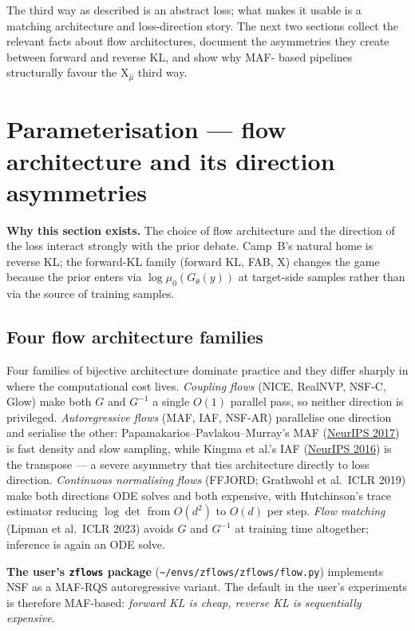 \documentclass[11pt,letterpaper]{article}
\newcommand{\Xfun}{\mathrm{X}}
\theoremstyle{plain}
\begin{document}
The third way as described is an abstract loss; what makes it usable is a
matching architecture and loss-direction story. The next two sections
collect the relevant facts about flow architectures, document the
asymmetries they create between forward and reverse KL, and show why MAF-
based pipelines structurally favour the $\Xfun_{\hat\mu}$ third way.

\section{Parameterisation --- flow architecture and its direction asymmetries}

\begin{callout}
\textbf{Why this section exists.} The choice of flow architecture and the direction
of the loss interact strongly with the prior debate. Camp~B's natural home is
reverse KL; the forward-KL family (forward KL, FAB, $\Xfun$) changes the game
because the prior enters via $\log\mu_0(G_\theta(y))$ at target-side samples
rather than via the source of training samples.
\end{callout}

\subsection{Four flow architecture families}

Four families of bijective architecture dominate practice and they differ
sharply in where the computational cost lives. \emph{Coupling flows} (NICE,
RealNVP, NSF-C, Glow) make both $G$ and $G^{-1}$ a single $O(1)$ parallel
pass, so neither direction is privileged. \emph{Autoregressive flows} (MAF,
IAF, NSF-AR) parallelise one direction and serialise the other:
Papamakarios--Pavlakou--Murray's MAF
(\href{https://arxiv.org/abs/1705.07057}{NeurIPS 2017}) is fast density and
slow sampling, while Kingma et al.'s IAF
(\href{https://arxiv.org/abs/1606.04934}{NeurIPS 2016}) is the transpose ---
a severe asymmetry that ties architecture directly to loss direction.
\emph{Continuous normalising flows} (FFJORD; Grathwohl et al.\ ICLR 2019) make
both directions ODE solves and both expensive, with Hutchinson's trace
estimator reducing $\log\det$ from $O(d^2)$ to $O(d)$ per step.
\emph{Flow matching} (Lipman et al.\ ICLR 2023) avoids $G$ and $G^{-1}$ at
training time altogether; inference is again an ODE solve.

\textbf{The user's \texttt{zflows} package} (\verb|~/envs/zflows/zflows/flow.py|)
implements NSF as a MAF-RQS autoregressive variant. The default in the user's
experiments is therefore MAF-based: \emph{forward KL is cheap, reverse KL is
sequentially expensive.}
\end{document}
